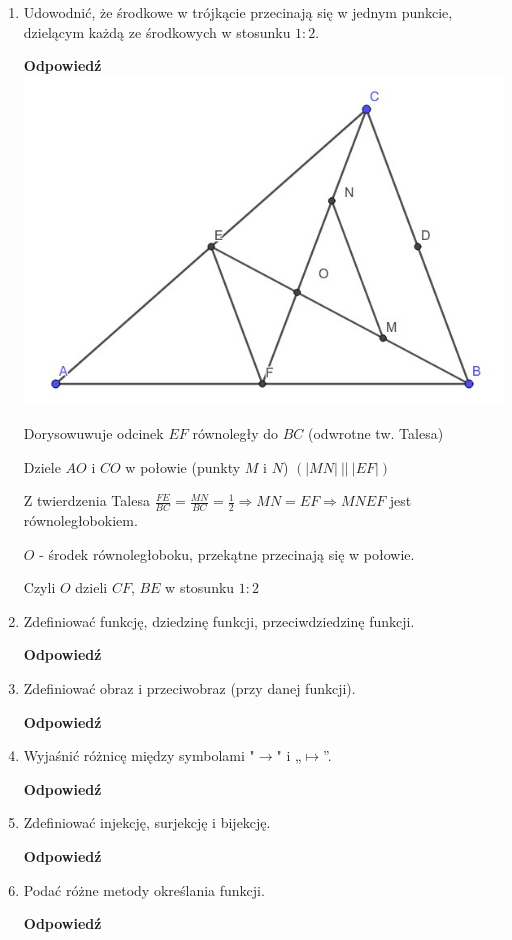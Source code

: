 \documentclass[12pt,a4paper]{article}
\theoremstyle{break}
\newcommand{\Odp}[1]{
		\begin{mdframed}[style=zadanie]
			\textbf{Odpowiedź}\\
			#1
		\end{mdframed}
	}
\begin{document}
\begin{enumerate}[1.]
{		Dwusieczne kątów $\angle ABC$ i $\angle ACB$ musza się przecinać.
	
		Wówczas $OO_B=OO_A \wedge OO_C=OO_A \Rightarrow OO_C=OO_B$, czyli jest to dwusieczna kąta $\angle BAC$ 
	}
	
	\item Udowodnić, że środkowe w trójkącie przecinają się w jednym punkcie, dzielącym każdą	ze środkowych w stosunku $1:2$.
	\Odp{
		\includegraphics[width=0.6\linewidth]{trj_proof_8.jpeg}
		
		Dorysowuwuje odcinek $EF$ równoległy do $BC$ (odwrotne tw. Talesa)
		
		Dziele $AO$ i $CO$ w połowie (punkty $M$ i $N$) $(|MN|\: ||\: |EF|)$
		
		Z twierdzenia Talesa $\frac{FE}{BC}=\frac{MN}{BC}=\frac{1}{2} \Rightarrow MN=EF \Rightarrow MNEF$ jest równoległobokiem.
		
		$O$ - środek równoległoboku, przekątne przecinają się w połowie.
		
		Czyli $O$ dzieli $CF$, $BE$ w stosunku $1:2$ 
	}
	
	\item Zdefiniować funkcję, dziedzinę funkcji, przeciwdziedzinę funkcji.
	\Odp{
		
	}
	
	\item Zdefiniować obraz i przeciwobraz (przy danej funkcji).
	\Odp{
		
	}
	
	\item Wyjaśnić różnicę między symbolami "$\longrightarrow$" i „$\longmapsto$”.
	\Odp{
		
	}
	
	\item Zdefiniować injekcję, surjekcję i bijekcję.
	\Odp{
		
	}
	
	\item Podać różne metody określania funkcji.
	\Odp{
		
}
\end{enumerate}
\end{document}
